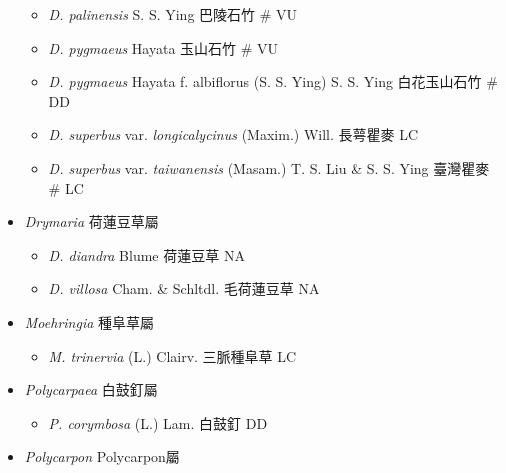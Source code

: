 \begin{itemize}
  \begin{itemize}
        \item[] \textit{D. palinensis} S. S. Ying  巴陵石竹  \# VU
        \item[] \textit{D. pygmaeus} Hayata  玉山石竹  \# VU
        \item[] \textit{D. pygmaeus} Hayata f. albiflorus (S. S. Ying) S. S. Ying  白花玉山石竹  \# DD
        \item[] \textit{D. superbus} var. \textit{longicalycinus} (Maxim.) Will.  長萼瞿麥   LC
        \item[] \textit{D. superbus} var. \textit{taiwanensis} (Masam.) T. S. Liu \& S. S. Ying  臺灣瞿麥  \# LC
  \end{itemize}
 \item[] \textit{Drymaria} 荷蓮豆草屬
                                
  \begin{itemize}
        \item[] \textit{D. diandra} Blume  荷蓮豆草   NA
        \item[] \textit{D. villosa} Cham. \& Schltdl.  毛荷蓮豆草   NA
  \end{itemize}
 \item[] \textit{Moehringia} 種阜草屬
                                
  \begin{itemize}
        \item[] \textit{M. trinervia} (L.) Clairv.  三脈種阜草   LC
  \end{itemize}
 \item[] \textit{Polycarpaea} 白鼓釘屬
                                
  \begin{itemize}
        \item[] \textit{P. corymbosa} (L.) Lam.  白鼓釘   DD
  \end{itemize}
 \item[] \textit{Polycarpon} Polycarpon屬
                                

\end{itemize}
